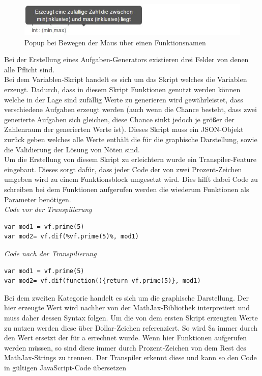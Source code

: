 \begin{figure}[htp]     %
\centering
\includegraphics[width=1\textwidth]{bilder/MouseOver} 
\caption[Popup bei Bewegen der Maus über einen Funktionsnamen]{Popup bei Bewegen der Maus über einen Funktionsnamen}
\end{figure} 

Bei der Erstellung eines Aufgaben-Generators existieren drei Felder von denen alle Pflicht sind. \\

Bei dem Variablen-Skript handelt es sich um das Skript welches die Variablen erzeugt. Dadurch, dass in diesem Skript Funktionen genutzt werden können welche in der Lage sind zufällig Werte zu generieren wird gewährleistet, dass verschiedene Aufgaben erzeugt werden (auch wenn die Chance besteht, dass zwei generierte Aufgaben sich gleichen, diese Chance sinkt jedoch je größer der Zahlenraum der generierten Werte ist). Dieses Skript muss ein JSON-Objekt zurück geben welches alle Werte enthält die für die graphische Darstellung, sowie die Validierung der Lösung von Nöten sind. \\
Um die Erstellung von diesem Skript zu erleichtern wurde ein Transpiler-Feature eingebaut. Dieses sorgt dafür, dass jeder Code der von zwei Prozent-Zeichen umgeben wird zu einem Funktionsblock umgesetzt wird. Dies hilft dabei Code zu schreiben bei dem Funktionen aufgerufen werden die wiederum Funktionen als Parameter benötigen.\\

\emph{Code vor der Transpilierung}
\begin{lstlisting}
var mod1 = vf.prime(5)
var mod2= vf.dif(%vf.prime(5)%, mod1)
\end{lstlisting}


\emph{Code nach der Transpilierung}
\begin{lstlisting}
var mod1 = vf.prime(5)
var mod2= vf.dif(function(){return vf.prime(5)}, mod1)
\end{lstlisting}


Bei dem zweiten Kategorie handelt es sich um die graphische Darstellung. Der hier erzeugte Wert wird nachher von der MathJax-Bibliothek interpretiert und muss daher dessen Syntax folgen. Um die von dem ersten Skript erzeugten Werte zu nutzen werden diese über Dollar-Zeichen referenziert. So wird \$a immer durch den Wert ersetzt der für a errechnet wurde.  Wenn hier Funktionen aufgerufen werden müssen, so sind diese immer durch Prozent-Zeichen von dem Rest des MathJax-Strings zu trennen. Der Transpiler erkennt diese und kann so den Code in gültigen JavaScript-Code übersetzen \\

